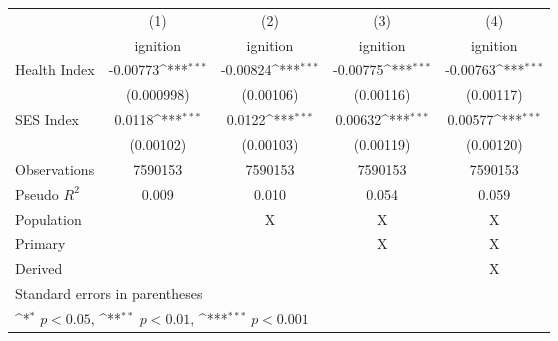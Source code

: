 {
\def\sym#1{\ifmmode^{#1}\else\(^{#1}\)\fi}
\begin{tabular}{l*{4}{c}}
\hline\hline
                    &\multicolumn{1}{c}{(1)}         &\multicolumn{1}{c}{(2)}         &\multicolumn{1}{c}{(3)}         &\multicolumn{1}{c}{(4)}         \\
                    &    ignition         &    ignition         &    ignition         &    ignition         \\
\hline
Health Index        &    -0.00773\sym{***}&    -0.00824\sym{***}&    -0.00775\sym{***}&    -0.00763\sym{***}\\
                    &  (0.000998)         &   (0.00106)         &   (0.00116)         &   (0.00117)         \\
[1em]
SES Index           &      0.0118\sym{***}&      0.0122\sym{***}&     0.00632\sym{***}&     0.00577\sym{***}\\
                    &   (0.00102)         &   (0.00103)         &   (0.00119)         &   (0.00120)         \\
\hline
Observations        &     7590153         &     7590153         &     7590153         &     7590153         \\
Pseudo \(R^{2}\)    &       0.009         &       0.010         &       0.054         &       0.059         \\
Population          &                     &           X         &           X         &           X         \\
Primary             &                     &                     &           X         &           X         \\
Derived             &                     &                     &                     &           X         \\
\hline\hline
\multicolumn{5}{l}{\footnotesize Standard errors in parentheses}\\
\multicolumn{5}{l}{\footnotesize \sym{*} \(p<0.05\), \sym{**} \(p<0.01\), \sym{***} \(p<0.001\)}\\
\end{tabular}
}
